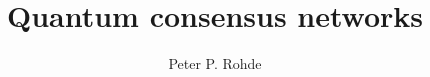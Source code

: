 \documentclass[twocolumn, aps, amsmath, amssymb, nofootinbib, superscriptaddress, longbibliography, floatfix, eqsecnum, rmp]{revtex4-2}
\begin{document}
\title{Quantum consensus networks}

\author{Peter P. Rohde}

\maketitle




\end{document}
